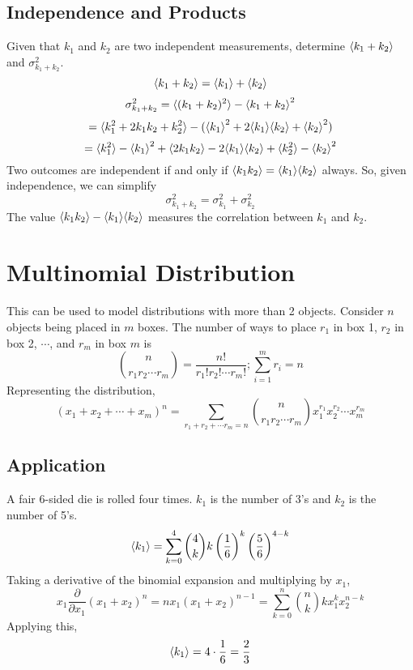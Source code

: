 \documentclass[../main.tex]{subfiles}
\begin{document}
\subsection{Independence and Products}
Given that $k_{1}$ and $k_{2}$ are two independent measurements, determine ${\langle k_{1}+k_{2} \rangle}$ and $\sigma_{k_{1}+k_{2}}^{2}$.
$${\langle k_1 + k_2 \rangle}={\langle k_1 \rangle}+{\langle k_2 \rangle}$$
$$\sigma_{k_1 + k_{2}}^{2}={\langle (k_1 + k_2)^{2} \rangle}-{\langle k_1 + k_2 \rangle}^{2}$$
$$={\langle k_{1}^{2}+2k_{1}k_{2}+k_{2}^{2} \rangle}-({\langle k_{1} \rangle}^{2}+2{\langle k_{1} \rangle}{\langle k_{2} \rangle}+{\langle k_{2} \rangle}^{2})$$
$$={\langle k_{1}^{2} \rangle}-{\langle k_{1} \rangle}^{2}+{\langle 2k_{1}k_{2} \rangle}-2{\langle k_{1} \rangle}{\langle k_{2} \rangle}+{\langle k_{2}^{2} \rangle}-{\langle k_{2} \rangle}^{2}$$
Two outcomes are independent if and only if ${\langle k_{1}k_{2} \rangle}={\langle k_{1} \rangle}{\langle k_{2} \rangle}$ always. So, given independence, we can simplify
$$\sigma_{k_1 + k_{2}}^{2}=\sigma_{k_1}^{2}+\sigma_{k_2}^{2}$$
The value ${\langle k_{1}k_{2} \rangle}-{\langle k_{1} \rangle}{\langle k_{2} \rangle}$ measures the correlation between $k_1$ and $k_2$.

\section{Multinomial Distribution}
This can be used to model distributions with more than 2 objects. Consider $n$ objects being placed in $m$ boxes.
The number of ways to place $r_{1}$ in box 1, $r_{2}$ in box 2, $\cdots$, and $r_{m}$ in box $m$ is
$${n \choose r_{1}r_{2}\cdots r_{m}}=\frac{n!}{r_{1}!r_{2}!\cdots r_{m}!};\sum_{i=1}^{m}r_{i}=n$$
Representing the distribution,
$$(x_{1}+x_{2}+\cdots+x_{m})^{n}=\sum_{r_{1}+r_{2}+\cdots r_{m}=n}{n \choose r_{1}r_{2}\cdots r_{m}}x_{1}^{r_{1}}x_{2}^{r_{2}}\cdots x_{m}^{r_{m}}$$
\subsection{Application}
A fair 6-sided die is rolled four times. $k_{1}$ is the number of 3's and $k_{2}$ is the number of 5's.
$${\langle k_{1} \rangle}=\sum_{k=0}^{4}{4\choose k}k\left(\frac{1}{6}\right)^{k}\left(\frac{5}{6}\right)^{4-k}$$
Taking a derivative of the binomial expansion and multiplying by $x_{1}$,
$$x_{1}\frac{\partial }{\partial x_{1}}(x_{1}+x_{2})^{n}=nx_{1}(x_{1}+x_{2})^{n-1}=\sum_{k=0}^{n}{n\choose k}kx_{1}^{k}x_{2}^{n-k}$$
Applying this,
$${\langle k_{1} \rangle}=4\cdot\frac{1}{6}=\frac{2}{3}$$
\end{document}
